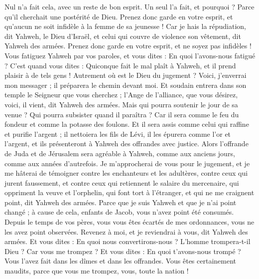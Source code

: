 \begin{multicols}{2}
Nul n’a fait cela, avec un reste de bon esprit. Un seul l’a fait, et pourquoi ? Parce qu'il cherchait une postérité de Dieu. Prenez donc garde en votre esprit, et qu’aucun ne soit infidèle à la femme de sa jeunesse !
Car je hais la répudiation, dit Yahweh, le Dieu d'Israël, et celui qui couvre de violence son vêtement, dit Yahweh des armées. Prenez donc garde en votre esprit, et ne soyez pas infidèles !
Vous fatiguez Yahweh par vos paroles, et vous dites : En quoi l'avons-nous fatigué ? C'est quand vous dites : Quiconque fait le mal plaît à Yahweh, et il prend plaisir à de tels gens ! Autrement où est le Dieu du jugement ?
\VerseOne{}Voici, j'enverrai mon messager ; il préparera le chemin devant moi. Et soudain entrera dans son temple le Seigneur que vous cherchez ; l’Ange de l'alliance, que vous désirez, voici, il vient, dit Yahweh des armées.
Mais qui pourra soutenir le jour de sa venue ? Qui pourra subsister quand il paraîtra ? Car il sera comme le feu du fondeur et comme la potasse des foulons.
Et il sera assis comme celui qui raffine et purifie l'argent ; il nettoiera les fils de Lévi, il les épurera comme l’or et l'argent, et ils présenteront à Yahweh des offrandes avec justice.
Alors l’offrande de Juda et de Jérusalem sera agréable à Yahweh, comme aux anciens jours, comme aux années d'autrefois.
Je m'approcherai de vous pour le jugement, et je me hâterai de témoigner contre les enchanteurs et les adultères, contre ceux qui jurent faussement, et contre ceux qui retiennent le salaire du mercenaire, qui oppriment la veuve et l'orphelin, qui font tort à l'étranger, et qui ne me craignent point, dit Yahweh des armées.
Parce que je suis Yahweh et que je n'ai point changé ; à cause de cela, enfants de Jacob, vous n'avez point été consumés.
Depuis le temps de vos pères, vous vous êtes écartés de mes ordonnances, vous ne les avez point observées. Revenez à moi, et je reviendrai à vous, dit Yahweh des armées. Et vous dites : En quoi nous convertirons-nous ?
L'homme trompera-t-il Dieu ? Car vous me trompez ? Et vous dites : En quoi t'avons-nous trompé ? Vous l'avez fait dans les dîmes et dans les offrandes.
Vous êtes certainement maudits, parce que vous me trompez, vous, toute la nation !

\end{multicols}
